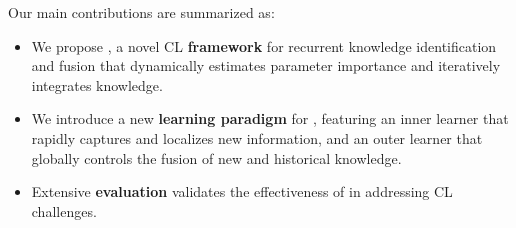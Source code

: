 Our main contributions are summarized as:
\begin{itemize}[leftmargin=*,itemsep=2pt,topsep=0pt,parsep=0pt]
\item 
We propose {\ouralg}, a novel CL \textbf{framework} for recurrent knowledge identification and fusion that dynamically estimates parameter importance and iteratively integrates knowledge.


\item 
We introduce a new \textbf{learning paradigm} for {\ouralg}, featuring an inner learner that rapidly captures and localizes new information, and an outer learner that globally controls the fusion of new and historical knowledge.

\item 


Extensive \textbf{evaluation} validates the effectiveness of {\ouralg} in addressing CL challenges.

\end{itemize}